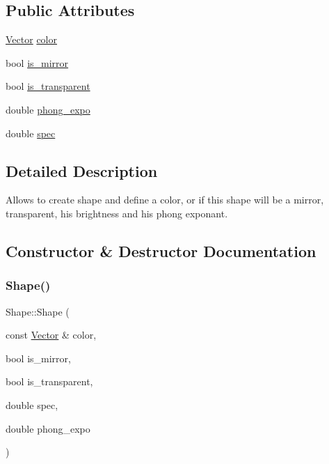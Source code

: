 \subsection*{Public Attributes}
\begin{DoxyCompactItemize}
\item 
\hyperlink{classVector}{Vector} \hyperlink{classShape_adb97857c268315aed7861e5204c2485b}{color}
\item 
bool \hyperlink{classShape_a0ead7657fa5e4c7862fe1cedd670a9e5}{is\+\_\+mirror}
\item 
bool \hyperlink{classShape_ab8da3fc4606e66dea941ec23d25f53ef}{is\+\_\+transparent}
\item 
double \hyperlink{classShape_a2556fca106f9503e6dfb4da703c28f7f}{phong\+\_\+expo}
\item 
double \hyperlink{classShape_a60ef96ac5dea3478fdd1ab320e4c3bef}{spec}
\end{DoxyCompactItemize}


\subsection{Detailed Description}
Allows to create shape and define a color, or if this shape will be a mirror, transparent, his brightness and his phong exponant. 

\subsection{Constructor \& Destructor Documentation}
\mbox{\label{classShape_ac15c3dd4d56ded4efccf75f820cce913}} 
\subsubsection{\texorpdfstring{Shape()}{Shape()}}
{\footnotesize\ttfamily Shape\+::\+Shape (\begin{DoxyParamCaption}\item[{const \hyperlink{classVector}{Vector} \&}]{color,  }\item[{bool}]{is\+\_\+mirror,  }\item[{bool}]{is\+\_\+transparent,  }\item[{double}]{spec,  }\item[{double}]{phong\+\_\+expo }\end{DoxyParamCaption})\hspace{0.3cm}{\ttfamily [inline]}}



